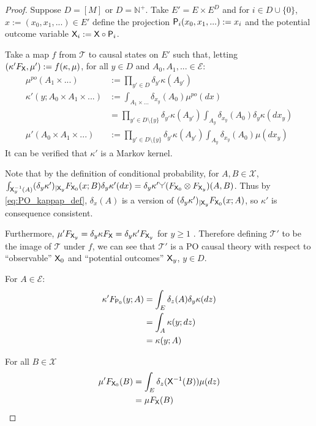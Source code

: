 \begin{proof}
Suppose $D=[M]$ or $D=\mathbb{N}^+$. Take $E' = E\times E^D$ and for $i\in D\cup\{0\}$, $x:=(x_0,x_1,...)\in E'$ define the projection $\mathsf{P}_i(x_0,x_1,...) := x_i$ and the potential outcome variable $\mathsf{X}_i:=\mathsf{X}\circ \mathsf{P}_i$. 

Take a map $f$ from $\mathscr{T}$ to causal states on $E'$ such that, letting $(\kappa' F_{\mathsf{X}},\mu'):=f(\kappa,\mu)$, for all $y\in D$ and $A_0,A_1, ...\in\mathcal{E}$:
\begin{align}
    \mu^{po}(A_1\times...) &:= \prod_{y'\in D} \delta_{y'} \kappa (A_{y'})\\
    \kappa' (y; A_0\times A_1\times...) &:= \int_{A_1\times ...} \delta_{x_y} (A_0) \mu^{po}(dx) \\
    &= \prod_{y'\in D\setminus\{y\}} \delta_{y'} \kappa (A_{y'}) \int_{A_y} \delta_{x_y} (A_0) \delta_y \kappa(dx_y) \label{eq:PO_kappap_def}\\
    \mu' ( A_0\times A_1\times...) &:= \prod_{y'\in D\setminus\{y\}} \delta_{y'} \kappa (A_{y'}) \int_{A_y} \delta_{x_y} (A_0) \mu(dx_y) \label{eq:consist}
\end{align}
It can be verified that $\kappa'$ is a Markov kernel.

Note that by the definition of conditional probability, for $A,B\in \mathcal{X}$, $\int_{\RV{X}_y^{-1}(A)} (\delta_y \kappa')_{|\RV{X}_y} F_{\RV{X}_0} (x;B) \delta_y\kappa' (dx)=\delta_y \kappa' \splitter{0.13}(F_{\RV{X}_0}\otimes F_{\RV{X}_y}) (A, B)$. Thus by \ref{eq:PO_kappap_def}, $\delta_x (A)$ is a version of $(\delta_y \kappa')_{|\mathsf{X}_y} F_{\mathsf{X}_0} (x;A)$, so $\kappa'$ is consequence consistent.

Furthermore, $\mu' F_{\mathsf{X}_y}=\delta_y \kappa F_{\mathsf{X}}=\delta_y \kappa' F_{\mathsf{X}_y}$ for $y\geq 1$ . Therefore defining $\mathscr{T}'$ to be the image of $\mathscr{T}$ under $f$, we can see that $\mathscr{T}'$ is a PO causal theory with respect to ``observable'' $\mathsf{X}_0$ and ``potential outcomes'' $\mathsf{X}_y$, $y\in D$.

For $A\in \mathcal{E}$:
\begin{align}
    \kappa' F_{\mathsf{P}_0} (y;A) &= \int_E \delta_{z} (A) \delta_y \kappa (dz)\\
                               &= \int_{A} \kappa(y;dz)\\
                               &= \kappa (y;A)
\end{align}


For all $B\in\mathscr{X}$
\begin{align}
    \mu' F_{\mathsf{X}_0} (B) &= \int_E \delta_{z} (\mathsf{X}^{-1}(B)) \mu (dz)\\
                               &= \mu F_{\mathsf{X}} (B)
\end{align}


\end{proof}
